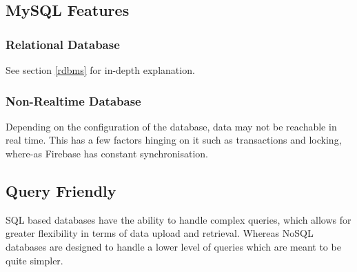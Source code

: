 \subsection{MySQL Features}
\subsubsection{Relational Database}
See section \ref{rdbms} for in-depth explanation.
\subsubsection{Non-Realtime Database}
Depending on the configuration of the database, data may not be reachable in real time. This has a few factors hinging on it such as transactions and locking, where-as Firebase has constant synchronisation.
\subsection{Query Friendly}
SQL based databases have the ability to handle complex queries, which allows for greater flexibility  in terms of data upload and retrieval. Whereas NoSQL databases are designed to handle a lower level of queries which are meant to be quite simpler. 